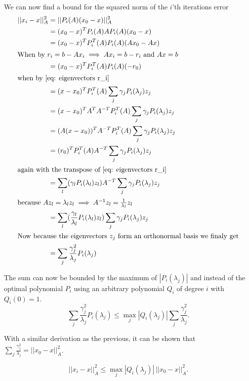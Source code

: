 \noindent We can now find a bound for the squared norm of the \(i\)'th iterations error
\begin{align*}
    ||x_i-x||_A^2&=||P_i(A)(x_0-x)||_A^2\\
    &=(x_0-x)^TP_i(A)AP_i(A)(x_0-x)\\
    &=(x_0-x)^TP_i^T(A)P_i(A)(Ax_0-Ax)\\
\intertext{When by \(r_i=b-Ax_i \implies Ax_i=b-r_i\) and \(Ax=b\)}
    &=(x_0-x)^TP_i^T(A)P_i(A)(-r_0)\\
\intertext{when by \eqref{eq: eigenvectors r_i}}
    &=(x-x_0)^TP_i^T(A)\sum_{j}\gamma_j P_i(\lambda_j)z_j\\
    &=(x-x_0)^T A^T A^{-T} P_i^T(A)\sum_{j}\gamma_j P_i(\lambda_j)z_j\\
    &=(A(x-x_0))^T A^{-T} P_i^T(A)\sum_{j}\gamma_j P_i(\lambda_j)z_j\\
    &=(r_0)^T P_i^T(A)A^{-T}\sum_{j}\gamma_j P_i(\lambda_j)z_j\\
\intertext{again with the transpose of \eqref{eq: eigenvectors r_i}}
    &=\sum_{l}(\gamma_l P_i(\lambda_l)z_l)A^{-T}\sum_{j}\gamma_j P_i(\lambda_j)z_j\\
\intertext{because \(Az_l=\lambda_l z_l \implies A^{-1}z_l=\frac{1}{\lambda_l}z_l\)}
    &=\sum_{l}(\frac{\gamma_l}{\lambda_l} P_i(\lambda_l)z_l)\sum_{j}\gamma_j P_i(\lambda_j)z_j\\
\intertext{Now because the eigenvectors \(z_j\) form an orthonormal basis we finaly get}
    &=\sum_{j}\frac{\gamma_j^2}{\lambda_j} P_i(\lambda_j)
\end{align*}

\noindent The sum can now be bounded by the maximum of \(|P_i(\lambda_j)|\) and instead of the optimal polynomial \(P_i\) using an arbitrary polynomial \(Q_i\) of degree \(i\) with \(Q_i(0)=1\).
\begin{equation*}
    \sum_{j}\frac{\gamma_j^2}{\lambda_j} P_i(\lambda_j)\leq \max_{j}|Q_i(\lambda_j)|\sum_{j}\frac{\gamma_j^2}{\lambda_j}.
\end{equation*}

\noindent With a similar derivation as the previous, it can be shown that \(\sum_{j}\frac{\gamma_j^2}{\lambda_j}=||x_0-x||_A^2\). 

\begin{equation*}
    ||x_i-x||_A^2\leq \max_{j}|Q_i(\lambda_j)|\,||x_0-x||_A^2.
\end{equation*}

